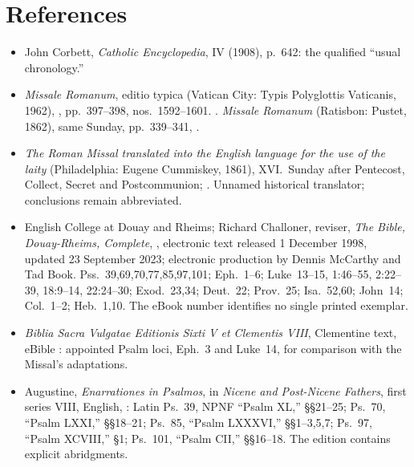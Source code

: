 \ifdefined\TriptychSynthesisEdition
\sectionguard
\else
\clearpage
\fi
\section*{References}
{\footnotesize\raggedright
\begin{itemize}[leftmargin=1.1em,itemsep=0.3em,parsep=0pt]
\item John Corbett,  \emph{Catholic Encyclopedia}, IV (1908), p.~642: the qualified ``usual chronology.''
\item \textit{Missale Romanum}, editio typica (Vatican City: Typis Polyglottis Vaticanis, 1962), , pp.~397--398, nos.~1592--1601. . \textit{Missale Romanum} (Ratisbon: Pustet, 1862), same Sunday, pp.~339--341, .
\item \textit{The Roman Missal translated into the English language for the use of the laity} (Philadelphia: Eugene Cummiskey, 1861), XVI.~Sunday after Pentecost, Collect, Secret and Postcommunion; . Unnamed historical translator; conclusions remain abbreviated.
\item English College at Douay and Rheims; Richard Challoner, reviser, \textit{The Bible, Douay-Rheims, Complete}, , electronic text released 1 December 1998, updated 23 September 2023; electronic production by Dennis McCarthy and Tad Book. Pss.~39,69,70,77,85,97,101; Eph.~1--6; Luke~13--15, 1:46--55, 2:22--39, 18:9--14, 22:24--30; Exod.~23,34; Deut.~22; Prov.~25; Isa.~52,60; John~14; Col.~1--2; Heb.~1,10. The eBook number identifies no single printed exemplar.
\item \textit{Biblia Sacra Vulgatae Editionis Sixti V et Clementis VIII}, Clementine text, eBible : appointed Psalm loci, Eph.~3 and Luke~14, for comparison with the Missal's adaptations.
\item Augustine, \textit{Enarrationes in Psalmos}, in \textit{Nicene and Post-Nicene Fathers}, first series VIII, English, : Latin Ps.~39, NPNF ``Psalm XL,'' §§21--25; Ps.~70, ``Psalm LXXI,'' §§18--21; Ps.~85, ``Psalm LXXXVI,'' §§1--3,5,7; Ps.~97, ``Psalm XCVIII,'' §1; Ps.~101, ``Psalm CII,'' §§16--18. The edition contains explicit abridgments.

\end{itemize}}
